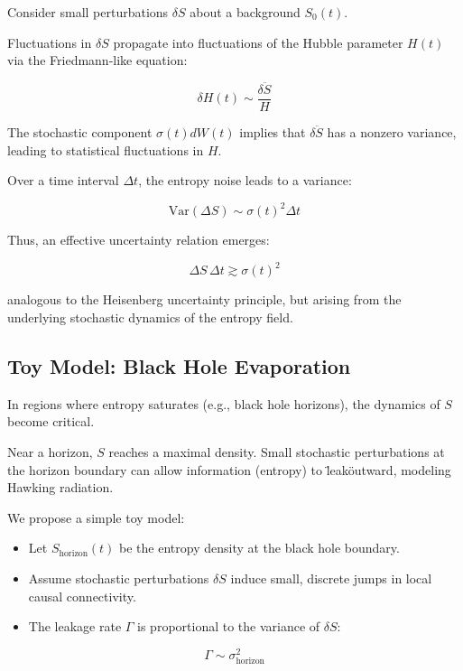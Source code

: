 \documentclass{article}
\begin{document}
Consider small perturbations $\delta S$ about a background $S_0(t)$.

Fluctuations in $\delta S$ propagate into fluctuations of the Hubble parameter $H(t)$ via the Friedmann-like equation:

\[
\delta H(t) \sim \frac{\delta \ddot{S}}{H}
\]

The stochastic component $\sigma(t) dW(t)$ implies that $\delta \ddot{S}$ has a nonzero variance, leading to statistical fluctuations in $H$.

Over a time interval $\Delta t$, the entropy noise leads to a variance:

\[
\text{Var}(\Delta S) \sim \sigma(t)^2 \Delta t
\]

Thus, an effective uncertainty relation emerges:

\begin{equation}
\Delta S \, \Delta t \gtrsim \sigma(t)^2
\label{eq:EntropyUncertainty}
\end{equation}

analogous to the Heisenberg uncertainty principle, but arising from the underlying stochastic dynamics of the entropy field.

\subsection{Toy Model: Black Hole Evaporation}

In regions where entropy saturates (e.g., black hole horizons), the dynamics of $S$ become critical.

Near a horizon, $S$ reaches a maximal density.
Small stochastic perturbations at the horizon boundary can allow information (entropy) to \"leak\" outward, modeling Hawking radiation.

We propose a simple toy model:

\begin{itemize}
\item Let $S_{\text{horizon}}(t)$ be the entropy density at the black hole boundary.
\item Assume stochastic perturbations $\delta S$ induce small, discrete jumps in local causal connectivity.
\item The leakage rate $\Gamma$ is proportional to the variance of $\delta S$:
\end{itemize}

\begin{equation}
\Gamma \sim \sigma_{\text{horizon}}^2
\end{equation}
\end{document}

